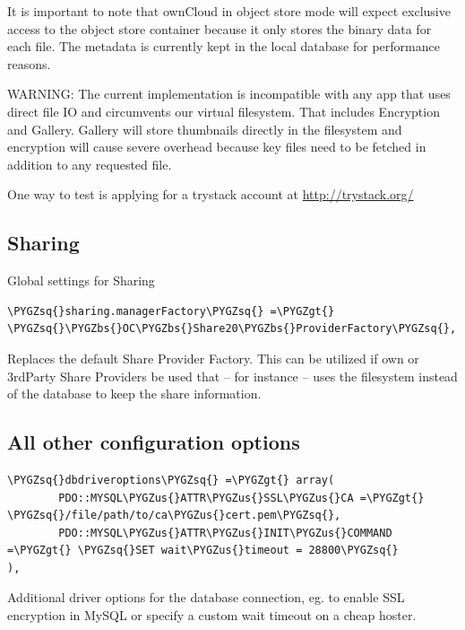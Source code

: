 \documentclass[letterpaper,10pt,english]{sphinxmanual}
\def\PYGZbs{\char`\\}
\def\PYGZus{\char`\_}
\def\PYGZgt{\char`\>}
\def\PYGZsq{\char`\'}
\renewcommand\PYGZsq{\textquotesingle}
\begin{document}
It is important to note that ownCloud in object store mode will expect
exclusive access to the object store container because it only stores the
binary data for each file. The metadata is currently kept in the local
database for performance reasons.

WARNING: The current implementation is incompatible with any app that uses
direct file IO and circumvents our virtual filesystem. That includes
Encryption and Gallery. Gallery will store thumbnails directly in the
filesystem and encryption will cause severe overhead because key files need
to be fetched in addition to any requested file.

One way to test is applying for a trystack account at \href{http://trystack.org/}{http://trystack.org/}


\subsection{Sharing}
\label{configuration_server/config_sample_php_parameters:sharing}
Global settings for Sharing

\begin{Verbatim}[commandchars=\\\{\}]
\PYGZsq{}sharing.managerFactory\PYGZsq{} =\PYGZgt{} \PYGZsq{}\PYGZbs{}OC\PYGZbs{}Share20\PYGZbs{}ProviderFactory\PYGZsq{},
\end{Verbatim}

Replaces the default Share Provider Factory. This can be utilized if
own or 3rdParty Share Providers be used that – for instance – uses the
filesystem instead of the database to keep the share information.


\subsection{All other configuration options}
\label{configuration_server/config_sample_php_parameters:all-other-configuration-options}
\begin{Verbatim}[commandchars=\\\{\}]
\PYGZsq{}dbdriveroptions\PYGZsq{} =\PYGZgt{} array(
        PDO::MYSQL\PYGZus{}ATTR\PYGZus{}SSL\PYGZus{}CA =\PYGZgt{} \PYGZsq{}/file/path/to/ca\PYGZus{}cert.pem\PYGZsq{},
        PDO::MYSQL\PYGZus{}ATTR\PYGZus{}INIT\PYGZus{}COMMAND =\PYGZgt{} \PYGZsq{}SET wait\PYGZus{}timeout = 28800\PYGZsq{}
),
\end{Verbatim}

Additional driver options for the database connection, eg. to enable SSL
encryption in MySQL or specify a custom wait timeout on a cheap hoster.
\end{document}
